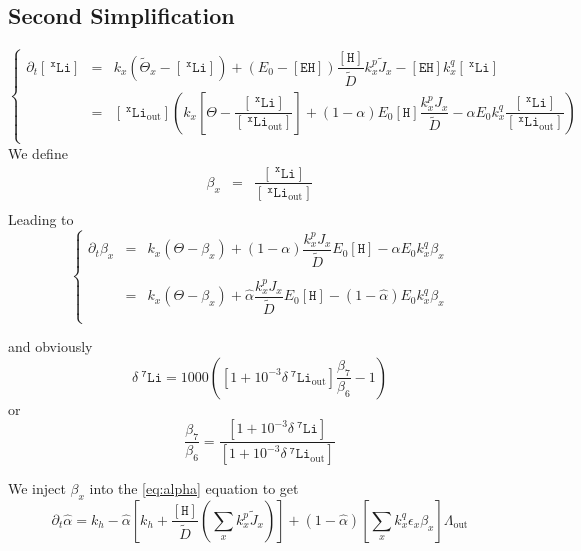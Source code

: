 \documentclass[aps,onecolumn,10pt]{revtex4}
\newcommand{\mychem}[1]{\mathtt{#1}}
\newcommand{\myconc}[1]{\left\lbrack{#1}\right\rbrack}
\newcommand{\spLi}[1]{{~^{\mychem{#1}}\mychem{Li}}}
\newcommand{\Li}[1]{\myconc{\spLi{#1}}}
\newcommand{\spLiOut}[1]{{\spLi{#1}}_{\mathrm{out}}}
\newcommand{\LiOut}[1]{\myconc{\spLiOut{#1}}}
\newcommand{\spEHin}{\mychem{EH}}
\newcommand{\EHin}{\myconc{\spEHin}}
\newcommand{\spproton}{\mychem{H}}
\newcommand{\proton}{\myconc{\spproton}}
\newcommand{\deltaLi}{ {\delta\!\!\!\spLi{7}} }
\newcommand{\deltaLiOut}{{\deltaLi}_{\mathrm{out}}}
\newcommand{\LiAll}{\Lambda}
\newcommand{\LiAllOut}{{\LiAll}_{\mathrm{out}}}
\begin{document}
\subsection{Second Simplification}
\begin{equation}
\left\lbrace
\begin{array}{rcl}
\partial_t\Li{x} & = & k_x \left(\tilde{\Theta}_x -\Li{x} \right)  + \left(E_0-\EHin\right) \dfrac{\proton}{\tilde{D}}   k_x^p \tilde{J}_x  - \EHin k_x^q \Li{x}
\\
 &=&   \LiOut{x} \left( k_x
 	\left[\Theta-\dfrac{\Li{x}}{\LiOut{x}}\right] 
	+ \left(1-\alpha\right) E_0 \proton \dfrac{ k_x^p J_x}{\tilde{D}}
 - \alpha  E_0 k_x^q \dfrac{\Li{x}}{\LiOut{x}}
  \right) \\
\end{array}
\right.
\end{equation}
We define
\begin{equation}
\begin{array}{rcl}
\beta_x & = & \dfrac{\Li{x}}{\LiOut{x}} \\
\end{array}
\end{equation}
Leading to
\begin{equation}
\left\lbrace
\begin{array}{rcl}
\partial_t \beta_x 
& = & k_x (\Theta-\beta_x)  + \left(1-\alpha\right) \dfrac{k_x^p J_x}{\tilde{D}} E_0 \proton  - \alpha E_0 k_x^q \beta_x
 \\
\\
& = & k_x (\Theta-\beta_x)  +  \hat\alpha \dfrac{ k_x^p J_x}{\tilde{D}} E_0 \proton  -  \left(1-\hat\alpha\right) E_0 k_x^q \beta_x
 \\
\end{array}
\right.
\end{equation}

and obviously
\begin{equation}
	\deltaLi = 1000 \left ( \left[1+10^{-3}\deltaLiOut\right] \dfrac{\beta_7}{\beta_6}-1\right)
\end{equation}
or
\begin{equation}
	\dfrac{ \beta_7}{\beta_6} = \dfrac{\left[1+10^{-3}\deltaLi\right]}{\left[1+10^{-3}\deltaLiOut\right]}
\end{equation}

We inject $\beta_x$ into the \eqref{eq:alpha} equation to get
\begin{equation}
	\partial_t \hat\alpha  =  k_h - \hat\alpha \left\lbrack k_h+ \dfrac{\proton}{\tilde{D}} \left(\sum_x k_x^p \tilde{J}_x \right)\right] 
		+ (1-\hat\alpha) \left\lbrack {\sum_x k_x^q \epsilon_x \beta_x } \right\rbrack \LiAllOut
\end{equation}
\end{document}
